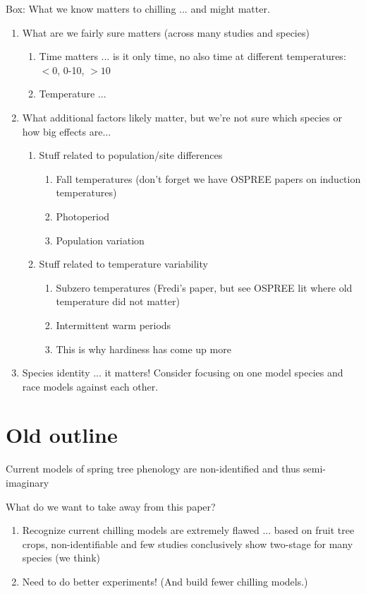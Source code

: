 \documentclass[11pt,letter]{article}
\begin{document}
Box: What we know matters to chilling ... and might matter. 
\begin{enumerate}
\item What are we fairly sure matters (across many studies and species)
\begin{enumerate}
\item Time matters ... is it only time, no also time at different temperatures: $<0$, 0-10, $>10$
\item Temperature ... 
\end{enumerate}
\item What additional factors likely matter, but we're not sure which species or how big effects are...
\begin{enumerate}
\item Stuff related to population/site differences
\begin{enumerate}
\item Fall temperatures (don't forget we have OSPREE papers on induction temperatures)
\item Photoperiod
\item Population variation
\end{enumerate}
\item Stuff related to temperature variability 
\begin{enumerate}
\item Subzero temperatures (Fredi's paper, but see OSPREE lit where old temperature did not matter)
\item Intermittent warm periods
\item This is why hardiness has come up more 
\end{enumerate}
\end{enumerate}
\item Species identity ... it matters! Consider focusing on one model species and race models against each other. 
\end{enumerate}

\clearpage
\section{Old outline} %

Current models of spring tree phenology are non-identified and thus semi-imaginary

What do we want to take away from this paper?
\begin{enumerate}
\item Recognize current chilling models are extremely flawed ... based on fruit tree crops, non-identifiable and few studies conclusively show two-stage for many species (we think) 
\item Need to do better experiments! (And build fewer chilling models.)
\end{enumerate}
\end{document}
